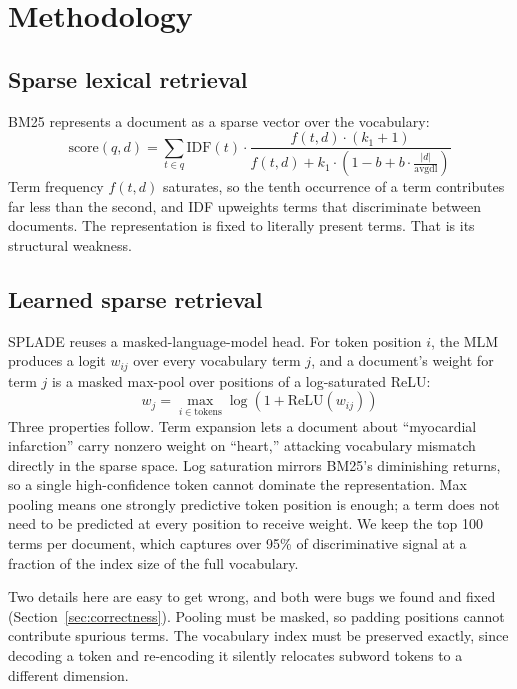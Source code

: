 \documentclass[11pt]{article}
\begin{document}
\section{Methodology}
\label{sec:methodology}

\subsection{Sparse lexical retrieval}

BM25 represents a document as a sparse vector over the vocabulary:
\begin{equation}
\text{score}(q,d) = \sum_{t \in q} \text{IDF}(t) \cdot \frac{f(t,d)\cdot(k_1+1)}{f(t,d) + k_1\cdot\left(1 - b + b\cdot\frac{|d|}{\text{avgdl}}\right)}
\end{equation}
Term frequency $f(t,d)$ saturates, so the tenth occurrence of a term contributes far less than the second, and IDF upweights terms that discriminate between documents. The representation is fixed to literally present terms. That is its structural weakness.

\subsection{Learned sparse retrieval}

SPLADE reuses a masked-language-model head. For token position $i$, the MLM produces a logit $w_{ij}$ over every vocabulary term $j$, and a document's weight for term $j$ is a masked max-pool over positions of a log-saturated ReLU:
\begin{equation}
w_j = \max_{i \in \text{tokens}} \log\left(1 + \text{ReLU}(w_{ij})\right)
\end{equation}
Three properties follow. Term expansion lets a document about ``myocardial infarction'' carry nonzero weight on ``heart,'' attacking vocabulary mismatch directly in the sparse space. Log saturation mirrors BM25's diminishing returns, so a single high-confidence token cannot dominate the representation. Max pooling means one strongly predictive token position is enough; a term does not need to be predicted at every position to receive weight. We keep the top 100 terms per document, which captures over 95\% of discriminative signal at a fraction of the index size of the full vocabulary.

Two details here are easy to get wrong, and both were bugs we found and fixed (Section~\ref{sec:correctness}). Pooling must be masked, so padding positions cannot contribute spurious terms. The vocabulary index must be preserved exactly, since decoding a token and re-encoding it silently relocates subword tokens to a different dimension.
\end{document}
